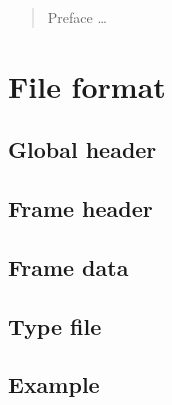 \documentclass[12pt]{scrartcl}
\begin{document}
\maketitle

\begin{abstract}
Preface \ldots
\end{abstract}

\section{File format}


\subsection{Global header}

\subsection{Frame header}

\subsection{Frame data}

\subsection{Type file}


\begin{appendices}
\section{Example}
\end{appendices}
\end{document}
